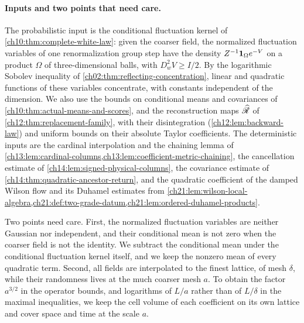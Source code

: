 \paragraph{Inputs and two points that need care.}
The probabilistic input is the conditional fluctuation kernel of \cref{ch10:thm:complete-white-law}: given the coarser field, the normalized fluctuation variables of one renormalization group step have the density $Z^{-1}\mathbf 1_{\Omega}e^{-V}$ on a product $\Omega$ of three-dimensional balls, with $D_w^2V\ge I/2$. By the logarithmic Sobolev inequality of \cref{ch02:thm:reflecting-concentration}, linear and quadratic functions of these variables concentrate, with constants independent of the dimension. We also use the bounds on conditional means and covariances of \cref{ch10:thm:actual-means-and-scores}, and the reconstruction maps $\widehat{\mathscr R}$ of \cref{ch12:thm:replacement-family}, with their disintegration (\cref{ch12:lem:backward-law}) and uniform bounds on their absolute Taylor coefficients. The deterministic inputs are the cardinal interpolation and the chaining lemma of \cref{ch13:lem:cardinal-columns,ch13:lem:coefficient-metric-chaining}, the cancellation estimate of \cref{ch14:lem:signed-physical-columns}, the covariance estimate of \cref{ch14:thm:quadratic-ancestor-return}, and the quadratic coefficient of the damped Wilson flow and its Duhamel estimates from \cref{ch21:lem:wilson-local-algebra,ch21:def:two-grade-datum,ch21:lem:ordered-duhamel-products}.

Two points need care. First, the normalized fluctuation variables are neither Gaussian nor independent, and their conditional mean is not zero when the coarser field is not the identity. We subtract the conditional mean under the conditional fluctuation kernel itself, and we keep the nonzero mean of every quadratic term. Second, all fields are interpolated to the finest lattice, of mesh $\delta$, while their randomness lives at the much coarser mesh $a$. To obtain the factor $a^{3/2}$ in the operator bounds, and logarithms of $L/a$ rather than of $L/\delta$ in the maximal inequalities, we keep the cell volume of each coefficient on its own lattice and cover space and time at the scale $a$.

